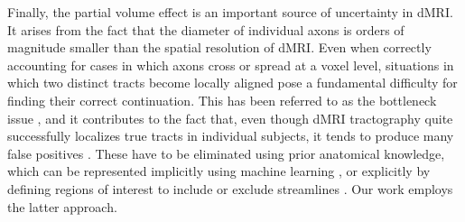 Finally, the partial volume effect is
an important source of uncertainty in dMRI. It arises from the fact that the diameter of individual axons is orders of magnitude smaller than the spatial resolution of dMRI. Even when correctly accounting for cases in which axons cross \cite{Alexander:2001,BEHRENS2007144} or spread \cite{Kaden:2007} at a voxel level, situations in which two distinct tracts become locally aligned pose a fundamental difficulty for finding their correct continuation. This has been referred to as the bottleneck issue \cite{Schilling:2022}, and it contributes to the fact that, even though dMRI tractography quite successfully localizes true tracts in individual subjects, it tends to produce many false positives \cite{MaierHein:2017}. These have to be eliminated using prior anatomical knowledge, which can be represented implicitly using machine learning \cite{WASSERTHAL2018239}, or explicitly by defining regions of interest to include or exclude streamlines \cite{Wakana:2007}. Our work employs the latter approach.

